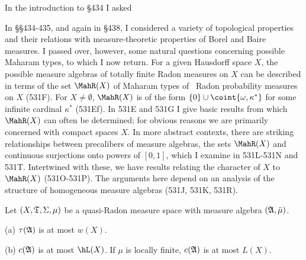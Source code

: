 
\def\chaptername{Topologies and measures III}
\def\sectionname{Maharam types of Radon measures}


In the introduction to \S434 I asked


\noindent In \S\S434-435, and again in \S438, I considered a variety of
topological properties and their relations with measure-theoretic
properties of Borel and Baire measures.   I passed over, however, some
natural questions concerning possible Maharam types, to which I now
return.   For a given Hausdorff space $X$, the possible measure algebras
of totally finite Radon measures on $X$ can be described in terms of the
set $\MahR(X)$ of Maharam types of \Mth\ Radon probability measures on
$X$ (531F).   For $X\ne\emptyset$, $\MahR(X)$ is of the form
$\{0\}\cup\coint{\omega,\kappa^*}$ for some infinite cardinal $\kappa^*$
(531Ef).   In 531E and 531G I give basic results from which $\MahR(X)$
can often be determined;  for obvious reasons we are primarily concerned
with compact spaces $X$.   In more abstract contexts, there are striking
relationships between precalibers of measure algebras, the sets
$\MahR(X)$ and continuous surjections onto powers of $[0,1]$, which I
examine in 531L-531N %
and 531T.   Intertwined with these, we have results relating the
character of $X$ to $\MahR(X)$ (531O-531P).   The arguments here depend
on an analysis of the structure of homogeneous measure algebras (531J,
531K, 531R).


 Let $(X,\frak T,\Sigma,\mu)$ be a quasi-Radon
measure space with measure algebra $(\frak A,\bar\mu)$.

(a) $\tau(\frak A)$ is
at most $w(X)$.

(b)  $c(\frak A)$ is at
most $\hL(X)$.   If $\mu$ is locally finite, $c(\frak A)$ is at most $L(X)$.

